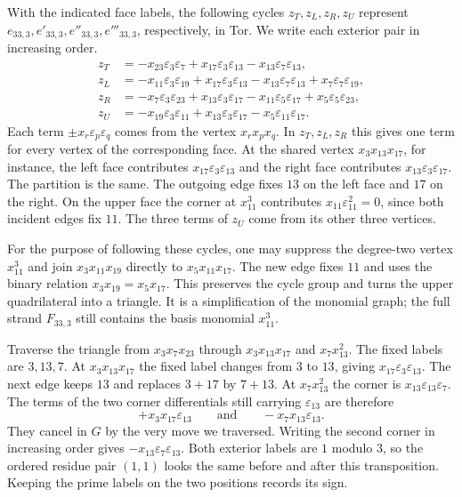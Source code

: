 \begin{example}
With the indicated face labels, the following cycles $z_T,z_L,z_R,z_U$
represent $e_{33,3},e'_{33,3},e''_{33,3},e'''_{33,3}$, respectively,
in Tor. We write each exterior pair in increasing order.
\[
\begin{aligned}
 z_T&=-x_{23}\varepsilon_3\varepsilon_7+x_{17}\varepsilon_3\varepsilon_{13}-x_{13}\varepsilon_7\varepsilon_{13},\\
 z_L&=-x_{11}\varepsilon_3\varepsilon_{19}+x_{17}\varepsilon_3\varepsilon_{13}-x_{13}\varepsilon_7\varepsilon_{13}+x_7\varepsilon_7\varepsilon_{19},\\
 z_R&=-x_7\varepsilon_3\varepsilon_{23}+x_{13}\varepsilon_3\varepsilon_{17}-x_{11}\varepsilon_5\varepsilon_{17}+x_5\varepsilon_5\varepsilon_{23},\\
 z_U&=-x_{19}\varepsilon_3\varepsilon_{11}+x_{13}\varepsilon_3\varepsilon_{17}-x_5\varepsilon_{11}\varepsilon_{17}.
\end{aligned}
\]
Each term $\pm x_r\varepsilon_p\varepsilon_q$ comes from the vertex
$x_rx_px_q$. In $z_T,z_L,z_R$ this gives one term for every vertex
of the corresponding face. At the shared vertex $x_3x_{13}x_{17}$,
for instance, the left face contributes $x_{17}\varepsilon_3\varepsilon_{13}$
and the right face contributes $x_{13}\varepsilon_3\varepsilon_{17}$.
The partition is the same. The outgoing edge fixes $13$ on the left face
and $17$ on the right. On the upper face the corner at $x_{11}^3$ contributes
$x_{11}\varepsilon_{11}^2=0$, since both incident edges fix $11$.
The three terms of $z_U$ come from its other three vertices.

For the purpose of following these cycles, one may suppress the
degree-two vertex $x_{11}^3$ and join $x_3x_{11}x_{19}$ directly to
$x_5x_{11}x_{17}$. The new edge fixes $11$ and uses the binary relation
$x_3x_{19}=x_5x_{17}$. This preserves the cycle group and turns the
upper quadrilateral into a triangle. It is a simplification of the
monomial graph; the full strand $F_{33,3}$ still contains the basis
monomial $x_{11}^3$.

Traverse the triangle from $x_3x_7x_{23}$ through
$x_3x_{13}x_{17}$ and $x_7x_{13}^2$. The fixed labels are $3,13,7$.
At $x_3x_{13}x_{17}$ the fixed label changes from $3$ to $13$,
giving $x_{17}\varepsilon_3\varepsilon_{13}$. The next edge keeps $13$ and replaces
$3+17$ by $7+13$. At $x_7x_{13}^2$ the corner is
$x_{13}\varepsilon_{13}\varepsilon_7$. The terms of the two corner
differentials still carrying $\varepsilon_{13}$ are therefore
\[
 +x_3x_{17}\varepsilon_{13}
 \qquad\text{and}\qquad
 -x_7x_{13}\varepsilon_{13}.
\]
They cancel in $G$ by the very move we traversed. Writing the second
corner in increasing order gives $-x_{13}\varepsilon_7\varepsilon_{13}$.
Both exterior labels are $1$ modulo $3$, so the ordered residue pair
$(1,1)$ looks the same before and after this transposition. Keeping the
prime labels on the two positions records its sign.


\end{example}
